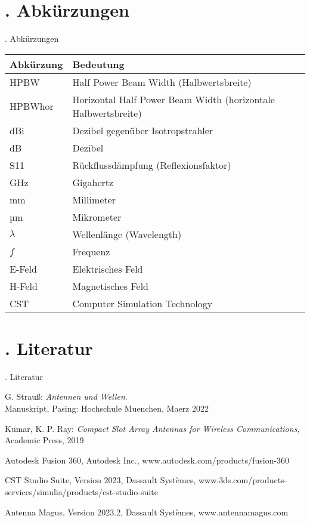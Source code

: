 \documentclass[
  aspectratio=169, %
]{beamer}
\begin{document}
\section*{\thesection. Abkürzungen}
\begin{frame}{\thesection. Abkürzungen}
\scriptsize
\begin{tabular}{|l|l|}
\hline
\textbf{Abkürzung} & \textbf{Bedeutung} \\
\hline
HPBW        & Half Power Beam Width (Halbwertsbreite) \\
HPBWhor     & Horizontal Half Power Beam Width (horizontale Halbwertsbreite) \\
dBi         & Dezibel gegenüber Isotropstrahler \\
dB          & Dezibel \\
S11         & Rückflussdämpfung (Reflexionsfaktor) \\
GHz         & Gigahertz \\
mm          & Millimeter \\
µm          & Mikrometer \\
$\lambda$   & Wellenlänge (Wavelength) \\
$f$         & Frequenz \\
E-Feld      & Elektrisches Feld \\
H-Feld      & Magnetisches Feld \\
CST         & Computer Simulation Technology \\
\hline
\end{tabular}
\end{frame}

\section*{\thesection. Literatur}
\begin{frame}[allowframebreaks]{\thesection. Literatur}
\begin{thebibliography}{}

G. Strauß: \textit{Antennen und Wellen}.\\ Manuskript, Pasing: Hochschule Muenchen, Maerz 2022

Kumar, K. P. Ray: \textit{Compact Slot Array Antennas for Wireless Communications},\\ Academic Press, 2019

Autodesk Fusion 360, Autodesk Inc., www.autodesk.com/products/fusion-360

CST Studio Suite, Version 2023, Dassault Systèmes, www.3ds.com/products-services/simulia/products/cst-studio-suite

Antenna Magus, Version 2023.2, Dassault Systèmes, www.antennamagus.com

\end{thebibliography}
\end{frame}




\end{document}
